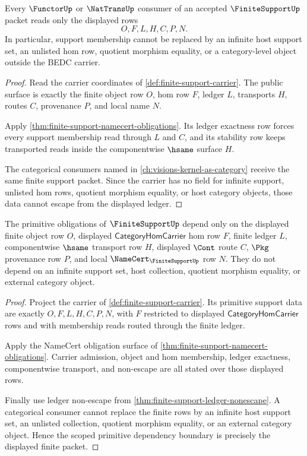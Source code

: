 \begin{theorem}
\label{thm:finite-support-ledger-nonescape}
Every $\FunctorUp$ or $\NatTransUp$ consumer of an accepted $\FiniteSupportUp$ packet reads only the displayed rows
$$
O,F,L,H,C,P,N.
$$
In particular, support membership cannot be replaced by an infinite host support set, an unlisted hom row, quotient morphism equality, or a category-level object outside the BEDC carrier.
\end{theorem}
\begin{proof}
Read the carrier coordinates of \autoref{def:finite-support-carrier}. The public surface is exactly the finite object row $O$, hom row $F$, ledger $L$, transports $H$, routes $C$, provenance $P$, and local name $N$.

Apply \autoref{thm:finite-support-namecert-obligations}. Its ledger exactness row forces every support membership read through $L$ and $C$, and its stability row keeps transported reads inside the componentwise $\hsame$ surface $H$.

The categorical consumers named in \autoref{ch:visions-kernel-as-category} receive the same finite support packet. Since the carrier has no field for infinite support, unlisted hom rows, quotient morphism equality, or host category objects, those data cannot escape from the displayed ledger.
\end{proof}

\begin{theorem}
\label{thm:finitesupport-scoped-primitive-dependency-coverage}
The primitive obligations of $\FiniteSupportUp$ depend only on the displayed finite object row $O$, displayed $\mathsf{CategoryHomCarrier}$ hom row $F$, finite ledger $L$, componentwise $\hsame$ transport row $H$, displayed $\Cont$ route $C$, $\Pkg$ provenance row $P$, and local $\NameCert_{\FiniteSupportUp}$ row $N$. They do not depend on an infinite support set, host collection, quotient morphism equality, or external category object.
\end{theorem}
\begin{proof}
Project the carrier of \autoref{def:finite-support-carrier}. Its primitive support data are exactly $O,F,L,H,C,P,N$, with $F$ restricted to displayed $\mathsf{CategoryHomCarrier}$ rows and with membership reads routed through the finite ledger.

Apply the NameCert obligation surface of \autoref{thm:finite-support-namecert-obligations}. Carrier admission, object and hom membership, ledger exactness, componentwise transport, and non-escape are all stated over those displayed rows.

Finally use ledger non-escape from \autoref{thm:finite-support-ledger-nonescape}. A categorical consumer cannot replace the finite rows by an infinite host support set, an unlisted collection, quotient morphism equality, or an external category object. Hence the scoped primitive dependency boundary is precisely the displayed finite packet.
\end{proof}

